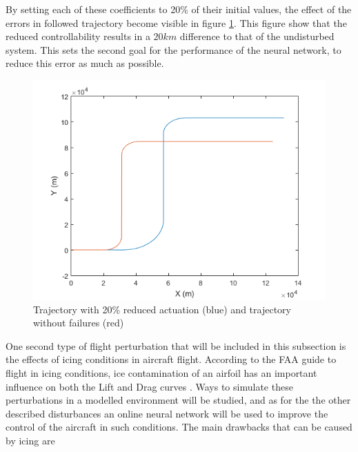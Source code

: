 By setting each of these coefficients to 20\% of their initial values, the effect of the errors in followed trajectory become visible in figure \ref{fig:reduced_act}. This figure show that the reduced controllability results in a $20km$ difference to that of the undisturbed system. This sets the second goal for the performance of the neural network, to reduce this error as much as possible.

\begin{figure}[H]
\centering
\includegraphics[width=\textwidth]{Figures/Results/reduced_act.png}
\caption[Trajectory with reduced actuation]{Trajectory with 20\% reduced actuation (blue) and trajectory without failures (red)}
\label{fig:reduced_act}
\end{figure}

One second type of flight perturbation that will be included in this subsection is the effects of icing conditions in aircraft flight. According to the FAA guide to flight in icing conditions, ice contamination of an airfoil has an important influence on both the Lift and Drag curves \cite{icing_cond}. Ways to simulate these perturbations in a modelled environment will be studied, and as for the the other described disturbances an online neural network will be used to improve the control of the aircraft in such conditions. The main drawbacks that can be caused by icing are


